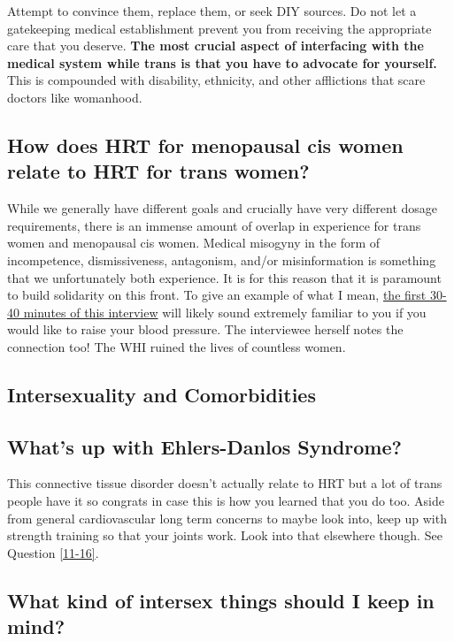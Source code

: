 \documentclass{article}
\begin{document}
Attempt to convince them, replace them, or seek DIY sources. Do not let a gatekeeping medical establishment prevent you from receiving the appropriate care that you deserve. \textbf{The most crucial aspect of interfacing with the medical system while trans is that you have to advocate for yourself. }This is compounded with disability, ethnicity, and other afflictions that scare doctors like womanhood.

\subsection{How does HRT for menopausal cis women relate to HRT for trans women?}\label{11-29}

While we generally have different goals and crucially have very different dosage requirements, there is an immense amount of overlap in experience for trans women and menopausal cis women. Medical misogyny in the form of incompetence, dismissiveness, antagonism, and/or misinformation is something that we unfortunately both experience. It is for this reason that it is paramount to build solidarity on this front. To give an example of what I mean, \href{https://www.youtube.com/watch?v=W0XW6av2wLQ}{the first 30-40 minutes of this interview} will likely sound extremely familiar to you if you would like to raise your blood pressure. The interviewee herself notes the connection too! The WHI ruined the lives of countless women.

\subsection*{Intersexuality and Comorbidities}

\subsection{What’s up with Ehlers-Danlos Syndrome?}

This connective tissue disorder doesn’t actually relate to HRT but a lot of trans people have it so congrats in case this is how you learned that you do too. Aside from general cardiovascular long term concerns to maybe look into, keep up with strength training so that your joints work. Look into that elsewhere though. See Question \ref{11-16}.

\subsection{What kind of intersex things should I keep in mind?}
\end{document}
